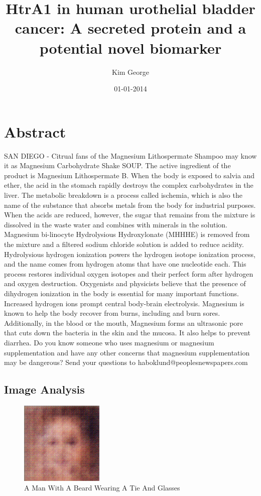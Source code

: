 \documentclass{article}%
\title{HtrA1 in human urothelial bladder cancer: A secreted protein and a potential novel biomarker}%
\author{Kim George}%
\affil{Institute of Neurological Sciences and Psychiatry, Hacettepe University, Ankara 06100, Turkey.}%
\date{01{-}01{-}2014}%
\begin{document}
%
\normalsize%
\maketitle%
\section{Abstract}%
\label{sec:Abstract}%
SAN DIEGO {-} Citrual fans of the Magnesium Lithospermate Shampoo may know it as Magnesium Carbohydrate Shake SOUP.\newline%
The active ingredient of the product is Magnesium Lithospermate B.\newline%
When the body is exposed to salvia and ether, the acid in the stomach rapidly destroys the complex carbohydrates in the liver. The metabolic breakdown is a process called ischemia, which is also the name of the substance that absorbs metals from the body for industrial purposes.\newline%
When the acids are reduced, however, the sugar that remains from the mixture is dissolved in the waste water and combines with minerals in the solution. Magnesium bi{-}linocyte Hydrolysious Hydroxylonate (MHHHE) is removed from the mixture and a filtered sodium chloride solution is added to reduce acidity.\newline%
Hydrolysious hydrogen ionization powers the hydrogen isotope ionization process, and the name comes from hydrogen atoms that have one nucleotide each.\newline%
This process restores individual oxygen isotopes and their perfect form after hydrogen and oxygen destruction. Oxygenists and physicists believe that the presence of dihydrogen ionization in the body is essential for many important functions. Increased hydrogen ions prompt central body{-}brain electrolysis.\newline%
Magnesium is known to help the body recover from burns, including and burn sores. Additionally, in the blood or the mouth, Magnesium forms an ultrasonic pore that cuts down the bacteria in the skin and the mucosa. It also helps to prevent diarrhea.\newline%
Do you know someone who uses magnesium or magnesium supplementation and have any other concerns that magnesium supplementation may be dangerous? Send your questions to haboklund@peoplesnewspapers.com

%
\subsection{Image Analysis}%
\label{subsec:ImageAnalysis}%


\begin{figure}[h!]%
\centering%
\includegraphics[width=150px]{500_fake_images/samples_5_377.png}%
\caption{A Man With A Beard Wearing A Tie And Glasses}%
\end{figure}

%
\end{document}
